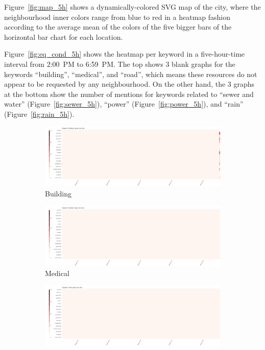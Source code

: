 Figure~\ref{fig:map_5h} shows a dynamically-colored SVG map of the city, where
the neighbourhood inner colors range from blue to red in a heatmap fashion
according to the average mean of the colors of the five bigger bars of the
horizontal bar chart for each location.

Figure~\ref{fig:eq_cond_5h} shows the heatmap per keyword in a five-hour-time 
interval from 2:00~PM to 6:59~PM. The top shows 3 blank graphs for the keywords
``building'', ``medical'', and ``road'', which means these resources do not 
appear to be requested by any neighbourhood. On the other hand, the 3 graphs at
the bottom show the number of mentions for keywords related to 
``sewer and water'' (Figure~\ref{fig:sewer_5h}), 
``power'' (Figure~\ref{fig:power_5h}), and ``rain'' (Figure~\ref{fig:rain_5h}). 

\begin{figure}[!h]
    \centering
    \begin{subfigure}[!h]{0.32\textwidth}
        \centering
        \includegraphics[width=1.00\textwidth]{figs/cond_5h/cond_5h_build.png}
        \caption{Building}
        \label{fig:build_5h}
    \end{subfigure}
    \begin{subfigure}[!h]{0.32\textwidth}
        \centering
        \includegraphics[width=1.00\textwidth]{figs/cond_5h/cond_5h_medical.png}
        \caption{Medical}
        \label{fig:medical_5h}
    \end{subfigure}
    \begin{subfigure}[!h]{0.32\textwidth}
        \centering
        \includegraphics[width=1.00\textwidth]{figs/cond_5h/cond_5h_road.png}

\end{subfigure}
\end{figure}
